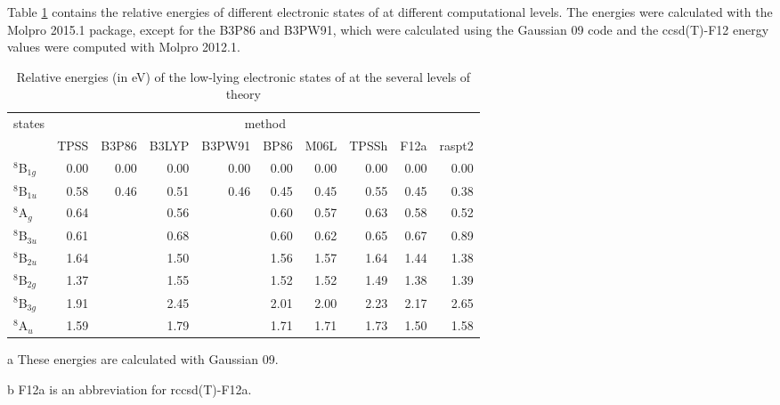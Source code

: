 \begin{refsection}
Table \ref{a7tbl:Cr2O2} contains the relative energies of different electronic states of  at different computational levels. The energies were calculated with the Molpro 2015.1 package, except for the B3P86 and B3PW91, which were calculated using the Gaussian 09 code  and the \acrshort{ccsd}(T)-F12 energy values were computed with Molpro 2012.1.  

\begin{table}[!htbp]
    \centering
    \small
	\caption{Relative energies (in eV) of the low-lying electronic states of  at the several levels of theory}
	\label{a7tbl:Cr2O2}
	\begin{threeparttable}
	\begin{tabular}{lrrrrrrrrr}
		\hline
		\multirow{2}{*}{states} & \multicolumn{9}{c}{method}                                          				   \\ \cline{2-10} 
				& TPSS 	 & B3P86\tnote{a}   & B3LYP & B3PW91\tnote{a}   & BP86 & M06L & TPSSh & F12a\tnote{b} & \acrshort{raspt2} \\ \hline
$^8$B$_{1g}$    & 0.00   & 0.00  			& 0.00  & 0.00   			& 0.00 & 0.00 & 0.00  & 0.00 		  & 0.00   \\
$^8$B$_{1u}$    & 0.58   & 0.46  			& 0.51  & 0.46   			& 0.45 & 0.45 & 0.55  & 0.45 		  & 0.38   \\
$^8$A$_g$       & 0.64   &       			& 0.56  &        			& 0.60 & 0.57 & 0.63  & 0.58 		  & 0.52   \\
$^8$B$_{3u}$    & 0.61   &       			& 0.68  &        			& 0.60 & 0.62 & 0.65  & 0.67 		  & 0.89   \\
$^8$B$_{2u}$    & 1.64   &       			& 1.50  &        			& 1.56 & 1.57 & 1.64  & 1.44 		  & 1.38   \\
$^8$B$_{2g}$    & 1.37   &       			& 1.55  &        			& 1.52 & 1.52 & 1.49  & 1.38 		  & 1.39   \\
$^8$B$_{3g}$    & 1.91   &       			& 2.45  &        			& 2.01 & 2.00 & 2.23  & 2.17 		  & 2.65   \\
$^8$A$_{u}$     & 1.59   &       			& 1.79  &        			& 1.71 & 1.71 & 1.73  & 1.50 		  & 1.58   \\ \hline
	\end{tabular}
	  \begin{tablenotes}
		\item[a]These energies are calculated with Gaussian 09.
		\item[b]F12a is an abbreviation for \acrshort{rccsd}(T)-F12a.
	\end{tablenotes}
\end{threeparttable}
\end{table}



\end{refsection}
